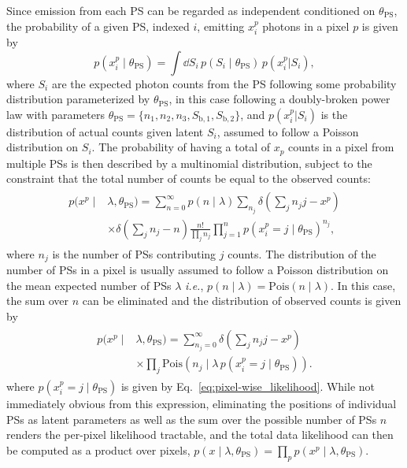 \documentclass[prd,aps,10pt,nofootinbib,twocolumn,superscriptaddress,preprintnumbers,balancelastpage,longbibliography]{revtex4-1}
\begin{document}
Since emission from each PS can be regarded as independent conditioned on $\theta_\mathrm{PS}$, the probability of a given PS, indexed $i$, emitting $x^p_i$ photons in a pixel $p$ is given by
\begin{equation}
\label{eq:pixel-wise_likelihood}
p(x^p_i\mid\theta_\mathrm{PS}) = \int \dd S_i \,p(S_i\mid\theta_\mathrm{PS})\,p(x^p_i|S_i),
\end{equation}
where $S_i$ are the expected photon counts from the PS following some probability distribution parameterized by $\theta_\mathrm{PS}$, in this case following a doubly-broken power law with parameters $\theta_\mathrm{PS} = \{n_1, n_2, n_3, S_\mathrm{b,1}, S_\mathrm{b,2}\}$, and $p(x^p_i|S_i)$ is the distribution of actual counts given latent $S_i$, assumed to follow a Poisson distribution on $S_i$. The probability of having a total of $x_p$ counts in a pixel from multiple PSs is then described by a multinomial distribution, subject to the constraint that the total number of counts be equal to the observed counts:
\small
\begin{align}
\label{eq:pixel-wise_likelihood_multinomial}
\begin{split}
p(x^p\mid&\lambda,\theta_\mathrm{PS}) =  \sum_{n = 0}^{\infty}  p\left(n \mid \lambda\right) \sum_{n_{j}} \delta\left(\sum_j n_{j}j - x^p\right) \\ 
&\times \delta\left(\sum_j n_{j} - n\right) \frac{n!}{\prod_j n_{j} }\prod_{j=1}^{n} p(x^p_i = j\mid\theta_\mathrm{PS})  ^ {n_{j}},
\end{split}
\end{align}
\normalsize
where $n_j$ is the number of PSs contributing $j$ counts. The distribution of the number of PSs in a pixel is usually assumed to follow a Poisson distribution on the mean expected number of PSs $\lambda$ \emph{i.e.}, $p(n\mid\lambda) = \mathrm{Pois}(n\mid\lambda)$. In this case, the sum over $n$ can be eliminated and the distribution of observed counts is given by
\begin{align}
\label{eq:pixel-wise_likelihood_poisson}
\begin{split}
p(x^p\mid&\lambda, \theta_\mathrm{PS}) = \sum_{n_j = 0}^{\infty} \delta\left(\sum_j n_{j}j - x^p\right) \\ & \times \prod_j \mathrm{Pois}\left(n_{j}\mid\lambda \, p(x^p_i = j\mid\theta_\mathrm{PS})\right).
\end{split}
\end{align}
where $p(x^p_i = j\mid\theta_\mathrm{PS})$ is given by Eq.~\eqref{eq:pixel-wise_likelihood}. 
While not immediately obvious from this expression, eliminating the positions of individual PSs as latent parameters as well as the sum over the possible number of PSs $n$ renders the per-pixel likelihood tractable, and the total data likelihood can then be computed as a product over pixels, $p(x\mid\lambda,\theta_\mathrm{PS}) = \prod_{p} p(x^p\mid\lambda,\theta_\mathrm{PS})$.
\end{document}

